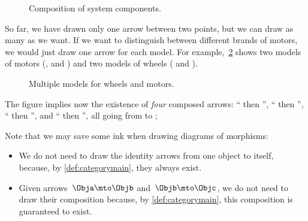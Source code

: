 \begin{figure}[h!]
    \centering
    \caption{Composition of system components. }
    \label{fig:e4}
\end{figure}

So far, we have drawn only one arrow between two points, but we can draw as many as we want.
If we want to distinguish between different brands of motors, we would just draw one arrow for each model.
For example,~\cref{fig:e4bis} shows two models of motors (, and ) and two models of wheels ( and ).

\begin{figure}[h!]
    \centering
    \caption{Multiple models for wheels and motors.}
    \label{fig:e4bis}
\end{figure}

The figure implies now the existence of \emph{four} composed arrows: `` then '', `` then '', `` then '', and `` then '', all going from \translationalmotion to \electricpower;





Note that we may save some ink when drawing diagrams of morphisms:
\begin{itemize}
    \item We do not need to draw the identity arrows from one object to itself, because, by \cref{def:categorymain}, they always exist.
    \item  Given arrows~$\Obja \mto \Objb$ and~$\Objb \mto \Objc$, we do not need to draw their composition because, by \cref{def:categorymain}, this composition is guaranteed to exist.
\end{itemize}


